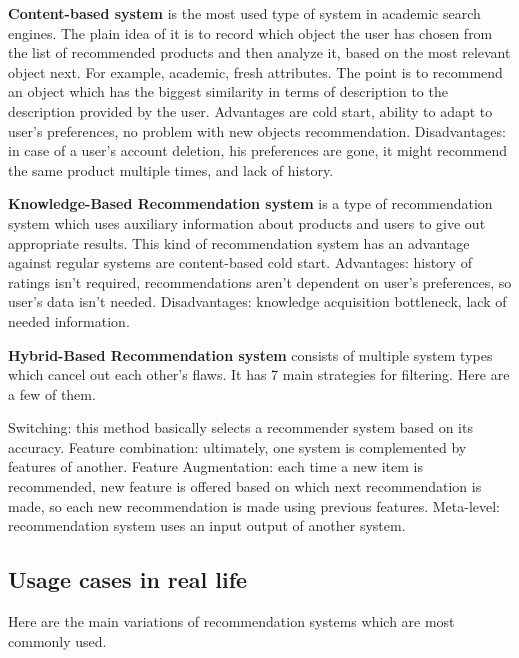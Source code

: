 \documentclass[10pt,twoside,english,a4paper]{article}
\begin{document}
\par \textbf{Content-based system} is the most used type of system in academic search engines. The plain idea of it is to record which object the user has chosen from the list of recommended products and then analyze it, based on the most relevant object next. For example, academic, fresh attributes. The point is to recommend an object which has the biggest similarity in terms of description to the description provided by the user. Advantages are cold start, ability to adapt to user's preferences, no problem with new objects recommendation. Disadvantages: in case of a user's account deletion, his preferences are gone, it might recommend the same product multiple times, and lack of history. 


\par \textbf{Knowledge-Based Recommendation system} is a type of recommendation system which uses auxiliary information about products and users to give out appropriate results. This kind of recommendation system has an advantage against regular systems are content-based cold start. 
Advantages: history of ratings isn't required, recommendations aren't dependent on user's preferences, so user's data isn't needed. Disadvantages: knowledge acquisition bottleneck, lack of needed information.




\par \textbf{Hybrid-Based Recommendation system} consists of multiple system types which cancel out each other's flaws. It has 7 main strategies for filtering. Here are a few of them.
\par Switching: this method basically selects a recommender system based on its accuracy. Feature combination: ultimately, one system is complemented by features of another. 
Feature Augmentation: each time a new item is recommended, new feature is offered based on which next recommendation is made, so each new recommendation is made using previous features. 
Meta-level: recommendation system uses an input output of another system. 
\subsection{Usage cases in real life}
Here are the main variations of recommendation systems which are most commonly used.
\end{document}
